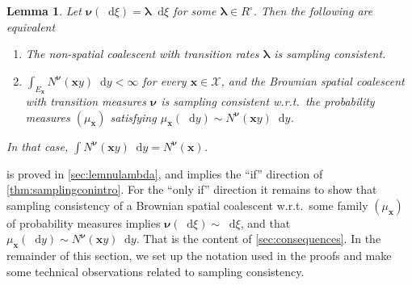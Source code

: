 \documentclass[reqno,draft]{amsart}
\numberwithin{equation}{section}
\theoremstyle{plain}
\newtheorem{lemma}[theorem]{Lemma}
\theoremstyle{remark}
\newcommand*\diff{\mathop{}\!\mathrm{d}}
\newcommand{\rates}{R^\circ} %
\begin{document}
\begin{lemma}\label{lem:nulambda}
    Let $\boldsymbol \nu(\diff \xi) = \boldsymbol \lambda \diff \xi$ for some $\boldsymbol \lambda \in \rates$. Then the following are equivalent
    \begin{enumerate}
        \item The non-spatial coalescent with transition rates $\boldsymbol \lambda$ is sampling consistent.
        \item  $\int_{E_{\boldsymbol x}} N^{\boldsymbol \nu}(\boldsymbol xy) \diff y < \infty$ for every $\boldsymbol x\in \mathcal{X}$, and the Brownian spatial coalescent with transition measures $\boldsymbol \nu$ is sampling consistent w.r.t.\ the probability measures $(\mu_{\boldsymbol x})$ satisfying  $\mu_{\boldsymbol x}(\diff y) \sim N^{\boldsymbol \nu}(\boldsymbol xy) \diff y$.
    \end{enumerate}
    In that case, $\int N^{\boldsymbol \nu}(\boldsymbol xy) \diff y = N^{\boldsymbol \nu}(\boldsymbol x)$.
\end{lemma}
%

 is proved in \cref{sec:lemnulambda}, and implies the ``if'' direction of \cref{thm:samplingconintro}. For the ``only if'' direction it remains to show that sampling consistency of a Brownian spatial coalescent w.r.t.\ some family $(\mu_{\boldsymbol x})$ of probability measures implies $\boldsymbol \nu(\diff \xi) \sim \diff \xi$, and that $\mu_{\boldsymbol x}(\diff y) \sim N^{\boldsymbol\nu}(\boldsymbol xy) \diff y$. That is the content of \cref{sec:consequences}. In the remainder of this section, we set up the notation used in the proofs and make some technical observations related to sampling consistency.
\end{document}
